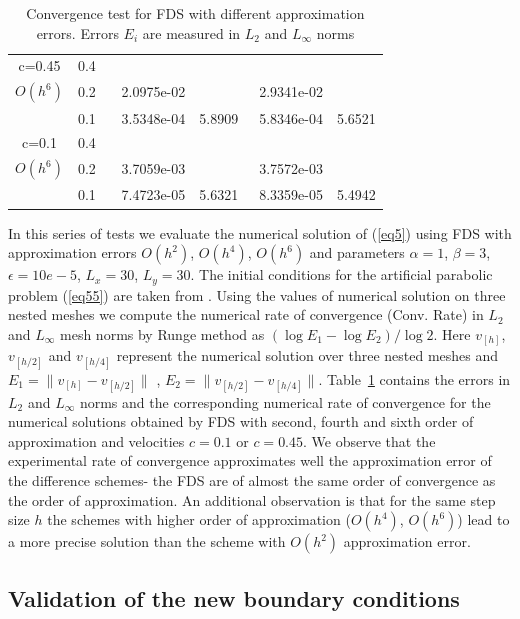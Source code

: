 \documentclass[preprint]{elsarticle}
\newcommand{\rf}[1]{(\ref{#1})}
\begin{document}
\begin{center}
\begin{table}[ht]
\begin{tabular}{||c|l|ll|ll||}
   c=0.45       &0.4   &            &        &                  &      \\
     $O(h^6)$   &0.2   &~ 2.0975e-02 &           &~2.9341e-02      &       \\
     &0.1  &~ 3.5348e-04 &5.8909  &~5.8346e-04 & 5.6521         \\
	  \hline
   c=0.1       &0.4   &             &        &               &        \\
     $O(h^6)$  &0.2   &~ 3.7059e-03  &        &~3.7572e-03     &       \\
   &0.1  &~ 7.4723e-05 &5.6321  &~8.3359e-05&   5.4942       \\
	   \hline
			\hline 
		\end{tabular}
		\caption{Convergence test for  FDS with different approximation errors. Errors $E_i$ are measured in $L_2$ and $L_\infty$ norms}

\label{tab:a}
\end{table}
\end{center}
 In this series of tests we evaluate the numerical solution of \rf{eq5} using FDS with approximation errors $O(h^2)$, $O(h^4)$, $O(h^6)$ and parameters  
 $\alpha = 1$,   $\beta=3$,  $\epsilon = 10e-5$, 
$L_{x }= 30$, $L_{y} = 30$.
The initial conditions for the artificial parabolic problem \rf{eq55} are taken from  \cite{Ch2011}. 
Using the values of numerical solution on three nested meshes we compute the numerical rate of convergence (Conv. Rate) in $L_2$ and $L_{\infty}$ mesh norms
by Runge method as $(\log E_1 -\log E_2)/\log 2$.  Here  $v_{[h]}$, $v_{ {[h/2]}  }$ and  $v_{ {[h/4]}  }$ represent the numerical solution over three nested meshes and $E_1=\|v_{[h]}-v_{[h/2]}\|$ , $E_2=\|v_{[h/2]}-v_{[h/4]}\|$.  
Table~\ref{tab:a} contains the errors in $L_2$ and $L_{\infty}$ norms and the corresponding numerical rate of convergence for the numerical solutions obtained by FDS with second, fourth and sixth order of approximation and   velocities  $c=0.1$  or $c=0.45$.
We observe that the experimental rate of convergence approximates well the approximation error of the difference schemes- the FDS are of  almost the same order of convergence as the order of approximation. An additional observation  is that  for  the same step size $h$ the schemes with higher order of approximation ($O(h^4)$, $O(h^6)$) lead to a more precise solution than the scheme with $O(h^2)$ approximation error. 


\subsection{Validation of the new boundary conditions}
\end{document}
